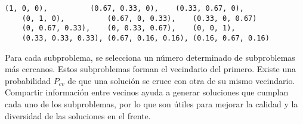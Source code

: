 \begin{lstlisting}[basicstyle=\ttfamily, caption=Direcciones de referencia.,label={lst:direcciones}]
    (1, 0, 0),          (0.67, 0.33, 0),    (0.33, 0.67, 0),
    (0, 1, 0),          (0.67, 0, 0.33),    (0.33, 0, 0.67)
    (0, 0.67, 0.33),    (0, 0.33, 0.67),    (0, 0, 1),
    (0.33, 0.33, 0.33), (0.67, 0.16, 0.16), (0.16, 0.67, 0.16)
\end{lstlisting}

Para cada subproblema, se selecciona un número determinado de subproblemas más cercanos. Estos subproblemas forman el vecindario del primero. Existe una probabilidad \( P_{cv} \) de que una solución se cruce con otra de su mismo vecindario. Compartir información entre vecinos ayuda a generar soluciones que cumplan cada uno de los subproblemas, por lo que son útiles para mejorar la calidad y la diversidad de las soluciones en el frente.~\cite{moead_pymoo} 